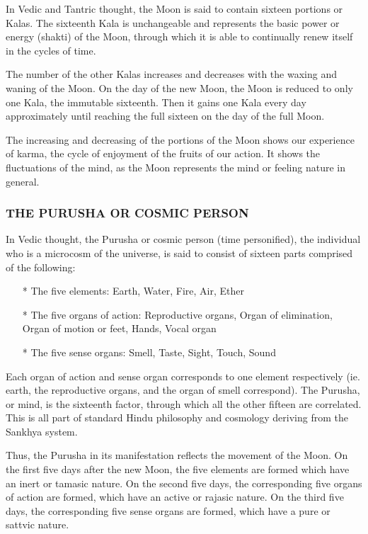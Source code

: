 In Vedic and Tantric thought, the Moon is said to contain sixteen portions or Kalas. The sixteenth Kala is unchangeable and represents the basic power or energy (shakti) of the Moon, through which it is able to continually renew itself in the cycles of time.

 

The number of the other Kalas increases and decreases with the waxing and waning of the Moon. On the day of the new Moon, the Moon is reduced to only one Kala, the immutable sixteenth. Then it gains one Kala every day approximately until reaching the full sixteen on the day of the full Moon.

 

The increasing and decreasing of the portions of the Moon shows our experience of karma, the cycle of enjoyment of the fruits of our action. It shows the fluctuations of the mind, as the Moon represents the mind or feeling nature in general.

 


\subsubsection{THE PURUSHA OR COSMIC PERSON}

In Vedic thought, the Purusha or cosmic person (time personified), the individual who is a microcosm of the universe, is said to consist of sixteen parts comprised of the following:

 

\begin{enumerate}
\item[*] The five elements: Earth, Water, Fire, Air, Ether
\item[*] The five organs of action: Reproductive organs, Organ of elimination, Organ of motion or feet, Hands, Vocal organ
\item[*] The five sense organs: Smell, Taste, Sight, Touch, Sound
 \end{enumerate}

Each organ of action and sense organ corresponds to one element respectively (ie. earth, the reproductive organs, and the organ of smell correspond). The Purusha, or mind, is the sixteenth factor, through which all the other fifteen are correlated. This is all part of standard Hindu philosophy and cosmology deriving from the Sankhya system.

 

Thus, the Purusha in its manifestation reflects the movement of the Moon. On the first five days after the new Moon, the five elements are formed which have an inert or tamasic nature. On the second five days, the corresponding five organs of action are formed, which have an active or rajasic nature. On the third five days, the corresponding five sense organs are formed, which have a pure or sattvic nature.

